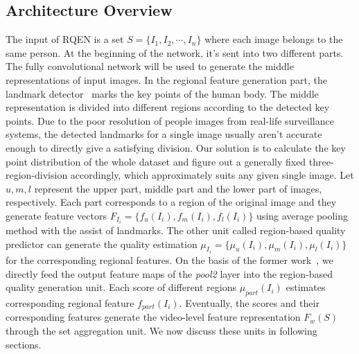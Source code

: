 \documentclass[letterpaper]{article} %
\begin{document}
\subsection{Architecture Overview}
The input of RQEN is a set $S = \{I_1,I_2,\cdots,I_n\}$ where each image belongs to the same person. At the beginning of the network, it's sent into two different parts. The fully convolutional network will be used to generate the middle representations of input images. In the regional feature generation part, the landmark detector~\cite{wei2016convolutional} marks the key points of the human body. The middle representation is divided into different regions according to the detected key points. Due to the poor resolution of people images from real-life surveillance systems, the detected landmarks for a single image usually aren't accurate enough to directly give a satisfying division. Our solution is to calculate the key point distribution of the whole dataset and figure out a generally fixed three-region-division accordingly, which approximately suits any given single image. Let $u,m,l$ represent the upper part, middle part and the lower part of images, respectively. Each part corresponds to a region of the original image and they generate feature vectors $F_{I_i} = \{f_{u}(I_i),f_{m}(I_i),f_{l}(I_i)\}$ using average pooling method with the assist of landmarks.
The other unit called region-based quality predictor can generate the quality estimation $\mu_{I_i}=\{\mu_{u}(I_i),\mu_{m}(I_i),\mu_{l}(I_i)\}$ for the corresponding regional features. On the basis of the former work~\cite{yu2017quality}, we directly feed the output feature maps of the \emph{pool2} layer into the region-based quality generation unit.
Each score of different regions $\mu_{part}(I_i)$ estimates corresponding regional feature $f_{part}(I_i)$. Eventually, the scores and their corresponding features generate the video-level feature representation $F_w(S)$ through the set aggregation unit. We now discuss these units in following sections.
\end{document}

